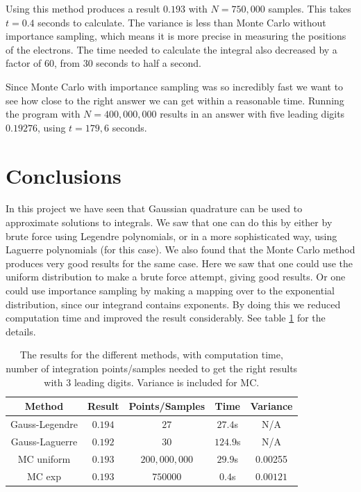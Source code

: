 \documentclass{aa}   %
\begin{document}
Using this method produces a result $ 0.193$ with $N = 750,000$ samples. This takes $t = 0.4$ seconds to calculate. The variance is less than Monte Carlo without importance sampling, which means it is more precise in measuring the positions of the electrons. The time needed to calculate the integral also decreased by a factor of 60, from 30 seconds to half a second.

Since Monte Carlo with importance sampling was so incredibly fast we want to see how close to the right answer we can get within a reasonable time. Running the program with $N = 400,000,000$ results in an answer with five leading digits $0.19276 $, using $t = 179,6 $ seconds. 
\section{Conclusions} \label{sec:conclusions}
In this project we have seen that Gaussian quadrature can be used to approximate solutions to integrals. We saw that one can do this by either by brute force using Legendre polynomials, or in a more sophisticated way, using Laguerre polynomials (for this case). We also found that the Monte Carlo method produces very good results for the same case. Here we saw that one could use the uniform distribution to make a brute force attempt, giving good results. Or one could use importance sampling by making a mapping over to the exponential distribution, since our integrand contains exponents. By doing this we reduced computation time and improved the result considerably. See table \ref{finalresults} for the details.
\begin{table}
\begin{tabular}{|c|c|c|c|c|}
\hline
Method & Result & Points/Samples & Time & Variance\\
\hline
 Gauss-Legendre & $0.194$ & $27$ & $27.4$s& N/A \\
 \hline
 Gauss-Laguerre & $0.192$ & $30$ & $124.9$s& N/A\\
 \hline
 MC uniform & $0.193$& $200,000,000$ & $29.9$s & 0.00255\\
 \hline
 MC exp & $0.193$& $750000$ & $0.4$s & $0.00121$ \\
 \hline
\end{tabular}
\caption{The results for the different methods, with computation time, number of integration points/samples needed to get the right results with 3 leading digits. Variance is included for MC.}
\label{finalresults}
\end{table}
\end{document}
